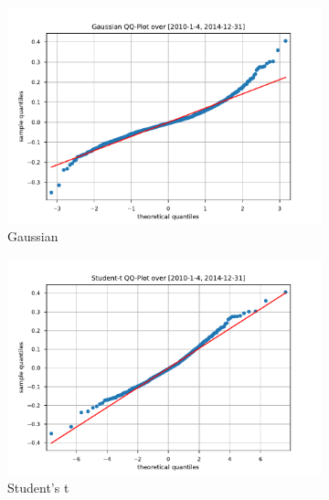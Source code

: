 \begin{figure}[htbp]
    \centering
    \begin{subfigure}[b]{0.32\textwidth}
        \centering
        \includegraphics[width=\textwidth]{content/reschap4/Figures/gauss_QQ_2010-1-4-2014-12-31.pdf}
        \caption{\small Gaussian}
    \end{subfigure}
    \hfill
    \begin{subfigure}[b]{0.32\textwidth}
        \centering
        \includegraphics[width=\textwidth]{content/reschap4/Figures/student_QQ_2010-1-4-2014-12-31.pdf}
        \caption{\small Student's t}
    \end{subfigure}
    \hfill
    \begin{subfigure}[b]{0.32\textwidth}
        \centering

\end{subfigure}
\end{figure}
